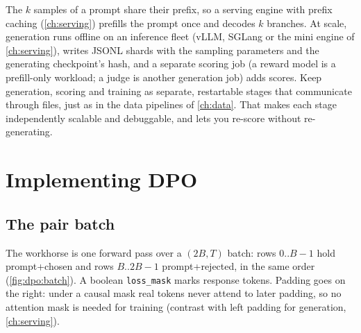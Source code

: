 \begin{systemslens}
The $k$ samples of a prompt share their prefix, so a serving engine with prefix caching
(\cref{ch:serving}) prefills the prompt once and decodes $k$ branches. At scale, generation runs
offline on an inference fleet (vLLM, SGLang or the mini engine of \cref{ch:serving}), writes JSONL
shards with the sampling parameters and the generating checkpoint's hash, and a separate scoring job
(a reward model is a prefill-only workload; a judge is another generation job) adds scores. Keep
generation, scoring and training as separate, restartable stages that communicate through files,
just as in the data pipelines of \cref{ch:data}. That makes each stage independently scalable
and debuggable, and lets you re-score without re-generating.
\end{systemslens}

\section{Implementing DPO}\label{sec:dpo:impl}

\subsection{The pair batch}

The workhorse is one forward pass over a $(2B,T)$ batch: rows $0..B{-}1$ hold prompt+chosen and
rows $B..2B{-}1$ prompt+rejected, in the same order (\cref{fig:dpo:batch}). A boolean
\texttt{loss\_mask} marks response tokens. Padding goes on the right: under a causal mask real
tokens never attend to later padding, so no attention mask is needed for training (contrast with
left padding for generation, \cref{ch:serving}).

